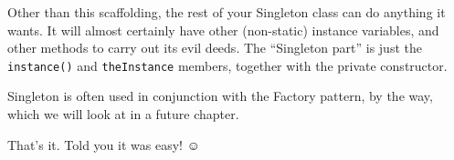 Other than this scaffolding, the rest of your Singleton class can do anything
it wants. It will almost certainly have other (non-static) instance variables,
and other methods to carry out its evil deeds. The ``Singleton part'' is just
the \texttt{instance()} and \texttt{theInstance} members, together with the
private constructor.

Singleton is often used in conjunction with the Factory pattern, by the way,
which we will look at in a future chapter.

That's it. Told you it was easy! $\smiley$
